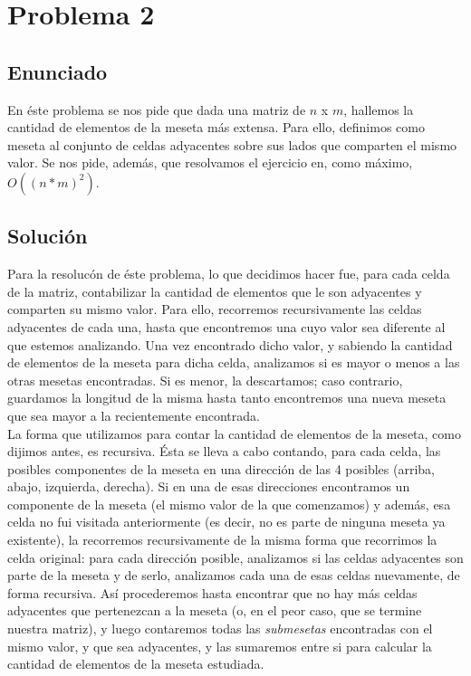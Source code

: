 \section{Problema 2}

\subsection{Enunciado}
En éste problema se nos pide que dada una matriz de $n$ x $m$, hallemos la cantidad de elementos de la meseta más extensa. Para ello, definimos como meseta al conjunto de celdas adyacentes sobre sus lados que comparten el mismo valor. Se nos pide, además, que resolvamos el ejercicio en, como máximo, $O((n*m)^2)$.

\subsection{Soluci\'on}
Para la resolucón de éste problema, lo que decidimos hacer fue, para cada celda de la matriz, contabilizar la cantidad de elementos que le son adyacentes y comparten su mismo valor. Para ello, recorremos recursivamente las celdas adyacentes de cada una, hasta que encontremos una cuyo valor sea diferente al que estemos analizando. Una vez encontrado dicho valor, y sabiendo la cantidad de elementos de la meseta para dicha celda, analizamos si es mayor o menos a las otras mesetas encontradas. Si es menor, la descartamos; caso contrario, guardamos la longitud de la misma hasta tanto encontremos una nueva meseta que sea mayor a la recientemente encontrada. \\
La forma que utilizamos para contar la cantidad de elementos de la meseta, como dijimos antes, es recursiva. Ésta se lleva a cabo contando, para cada celda, las posibles componentes de la meseta en una dirección de las 4 posibles (arriba, abajo, izquierda, derecha). Si en una de esas direcciones encontramos un componente de la meseta (el mismo valor de la que comenzamos) y además, esa celda no fui visitada anteriormente (es decir, no es parte de ninguna meseta ya existente), la recorremos recursivamente de la misma forma que recorrimos la celda original: para cada dirección posible, analizamos si las celdas adyacentes son parte de la meseta y de serlo, analizamos cada una de esas celdas nuevamente, de forma recursiva. Así procederemos hasta encontrar que no hay más celdas adyacentes que pertenezcan a la meseta (o, en el peor caso, que se termine nuestra matriz), y luego contaremos todas las \textit{submesetas} encontradas con el mismo valor, y que sea adyacentes, y las sumaremos entre si para calcular la cantidad de elementos de la meseta estudiada. \\
